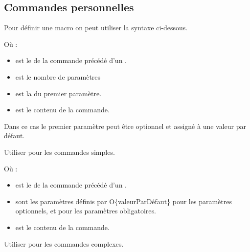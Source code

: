 \subsection{Commandes personnelles}

\begin{Methode}
    Pour définir une macro on peut utiliser la syntaxe ci-dessous.
    \begin{tcbenumerate}[2]
        \tcbitem  {}

        Où : 
        \begin{itemize}[label=$\bullet$]
            \item {} est le  de la commande précédé d'un .
            \item {} est le nombre de paramètres
            \item {} est la  du premier paramètre.
            \item {} est le contenu de la commande.
        \end{itemize}
        Dans ce cas le premier paramètre peut être optionnel et assigné à une valeur par défaut. 

        Utiliser pour les commandes simples.

        \tcbitem  {}

        Où : 
        \begin{itemize}[label=$\bullet$]
            \item {} est le  de la commande précédé d'un .
            \item {} sont les paramètres définis par O\{valeurParDéfaut\} pour les paramètres optionnels, et  pour les paramètres obligatoires.
            \item {} est le contenu de la commande.
        \end{itemize}
        Utiliser pour les commandes complexes.
    \end{tcbenumerate}
\end{Methode}
\newpage

